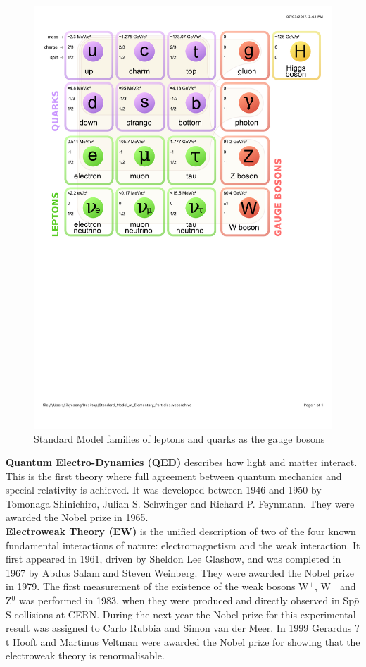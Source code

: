 \begin{figure}[htbp]
\begin{center}
\includegraphics[width=12.cm]{./Version1/FigChapter1/SM}
\caption{Standard Model families of leptons and quarks as the gauge bosons}
\label{fig:sm}
\end{center}
\end{figure}

\textbf{Quantum Electro-Dynamics (QED)} describes how light and matter interact. This is the first theory where full agreement between quantum mechanics and special relativity is achieved. It was developed between 1946 and 1950 by Tomonaga Shinichiro, Julian S. Schwinger and Richard P. Feynmann. They were awarded the Nobel prize in 1965. \\

\textbf{Electroweak Theory (EW)} is the unified description of two of the four known fundamental interactions of nature: electromagnetism and the weak interaction. It first appeared in 1961, driven by Sheldon Lee Glashow, and was completed in 1967 by Abdus Salam and Steven Weinberg. They were awarded the Nobel prize in 1979. The first measurement of the existence of the weak bosons W$^{+}$, W$^{-}$ and Z$^{0}$ was performed in 1983, when they were produced and directly observed in Sp$\bar{p}$S collisions at CERN. During the next year the Nobel prize for this experimental result was assigned to Carlo Rubbia and Simon van der Meer. In 1999 Gerardus ?t Hooft and Martinus Veltman were awarded the Nobel prize for showing that the electroweak theory is renormalisable. \\

